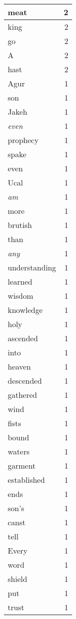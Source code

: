 \begin{center}
\begin{longtable}{l|r}
meat & 2\\ \hline 
king & 2\\ \hline 
go & 2\\ \hline 
A & 2\\ \hline 
hast & 2\\ \hline 
Agur & 1\\ \hline 
son & 1\\ \hline 
Jakeh & 1\\ \hline 
\emph{even} & 1\\ \hline 
prophecy & 1\\ \hline 
spake & 1\\ \hline 
even & 1\\ \hline 
Ucal & 1\\ \hline 
\emph{am} & 1\\ \hline 
more & 1\\ \hline 
brutish & 1\\ \hline 
than & 1\\ \hline 
\emph{any} & 1\\ \hline 
understanding & 1\\ \hline 
learned & 1\\ \hline 
wisdom & 1\\ \hline 
knowledge & 1\\ \hline 
holy & 1\\ \hline 
ascended & 1\\ \hline 
into & 1\\ \hline 
heaven & 1\\ \hline 
descended & 1\\ \hline 
gathered & 1\\ \hline 
wind & 1\\ \hline 
fists & 1\\ \hline 
bound & 1\\ \hline 
waters & 1\\ \hline 
garment & 1\\ \hline 
established & 1\\ \hline 
ends & 1\\ \hline 
son's & 1\\ \hline 
canst & 1\\ \hline 
tell & 1\\ \hline 
Every & 1\\ \hline 
word & 1\\ \hline 
shield & 1\\ \hline 
put & 1\\ \hline 
trust & 1\\ \hline 

\end{longtable}
\end{center}
